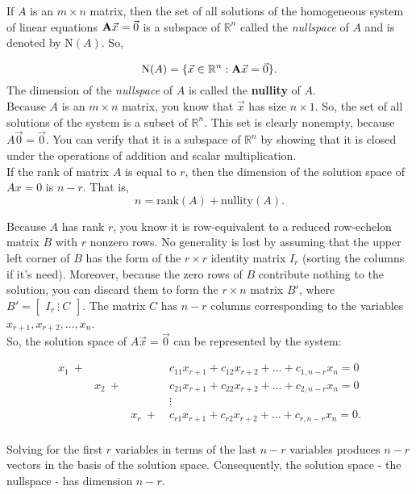 If $A$ is an $m \times n$ matrix, then the set of all solutions of the homogeneous system of linear equations $\textbf A \vec x = \vec 0$ is a subspace of $\mathbb{R}^n$ called the \textit{nullspace} of $A$ and is denoted by $\text{N}(A)$. So,

\[
\text{N}(A) = \{\vec x \in \mathbb{R}^n : \textbf A \vec x = \vec 0\}.
\]
The dimension of the \textit{nullspace} of $A$ is called the \textbf{nullity} of $A$.
\\

Because $A$ is an $m \times n$ matrix, you know that $\vec x$ has size $n \times 1$. So, the set of all solutions of
the system is a subset of $\mathbb{R}^n$. This set is clearly nonempty, because $A \vec 0 = \vec 0$. You can verify
that it is a subspace of $\mathbb R^n$ by showing that it is closed under the operations of addition and scalar
multiplication.
\\

If the rank of matrix $A$ is equal to $r$, then the dimension of the solution space of $Ax = 0$ is $n - r$. That is,
\[
n = \text{rank}(A) + \text{nullity}(A).
\]

Because $A$ has rank $r$, you know it is row-equivalent to a reduced row-echelon matrix $B$ with $r$ nonzero rows. No generality is lost by assuming that the upper left corner of $B$ has the form of the $r \times r$ identity matrix $I_r$ (sorting the columns if it's need). Moreover, because the zero rows of $B$ contribute nothing to the solution, you can discard them to form the $r \times n$ matrix $B'$, where $B' = \begin{bmatrix} I_r \ \vdots \ C \end{bmatrix}$. The matrix $C$ has $n - r$ columns corresponding to the variables $x_{r+1}, x_{r+2}, \dots, x_n$. 
\\

So, the solution space of $A \vec x = \vec 0$ can be represented by the system:

\[
\begin{aligned}
x_1 \ +& & & c_{11}x_{r+1} + c_{12}x_{r+2} + \dots + c_{1,n-r}x_n = 0 \\
&x_2 \ +& & c_{21}x_{r+1} + c_{22}x_{r+2} + \dots + c_{2,n-r}x_n = 0 \\
&&&\vdots \\
&&x_r \ + \ & c_{r1}x_{r+1} + c_{r2}x_{r+2} + \dots + c_{r,n-r}x_n = 0. \\
\end{aligned}
\]

Solving for the first $r$ variables in terms of the last $n - r$ variables produces $n - r$ vectors in the basis of the solution space. Consequently, the solution space - the nullspace - has dimension $n - r$.
\\

